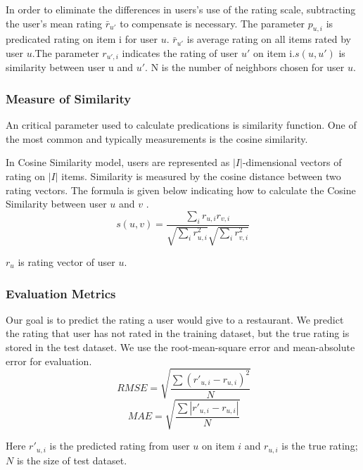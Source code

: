 \documentclass[conference]{IEEEtran}
\begin{document}
In order to eliminate the differences in users's use of the rating scale, subtracting the user's mean rating ${\bar r_{u'}}$ to compensate is necessary.   The parameter $p_{u,i}$ is predicated rating on item i for user $u$.  ${\bar r_{u'}}$ is average rating on all items rated by user $u$.The parameter $r_{u',i}$ indicates the rating of user $u'$ on item i.$s(u,u')$ is similarity between user u and $u'$. N is the number of neighbors chosen for user $u$.  

\subsubsection{Measure of Similarity}
An critical parameter used to calculate predications is similarity function. One of the most common and typically measurements is the cosine similarity. 

In Cosine Similarity model, users are represented as $|\textit{I}|$-dimensional vectors of rating on $|\textit{I}|$ items. Similarity is measured by the cosine distance between two rating vectors. The formula is given below indicating how to calculate the Cosine Similarity between user $u$ and $v$ \cite{Herlocker}. 
\begin{equation}
s(u,v) = \frac{\sum\nolimits_{i} r_{u,i}r_{v,i}}{\sqrt{\sum\nolimits_{i} {r^{2}_{u,i}}} \sqrt{\sum\nolimits_{i} {r^{2}_{v,i}}}} 
\end{equation}

$r_u$ is rating vector of user $u$.

\subsubsection{Evaluation Metrics}
Our goal is to predict the rating a user would give to a restaurant. We predict the rating that user has not rated in the training dataset, but the true rating is stored in the test dataset. We use the root-mean-square error and mean-absolute error for evaluation.
\begin{equation}
\ RMSE = \sqrt{\frac{\sum{\left(r'_{u,i} - r_{u,i}\right)}^2}{N}}
\end{equation}
\begin{equation}
\ MAE = \sqrt{\frac{\sum{\left|r'_{u,i} - r_{u,i}\right|}}{N}}
\end{equation}

Here $r'_{u,i}$ is the predicted rating from user $u$ on item $i$ and $r_{u,i}$ is the true rating; $N$ is the size of test dataset. 
\end{document}
